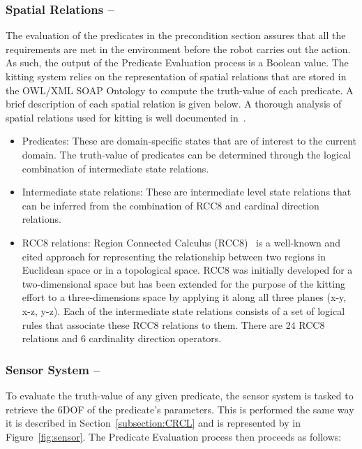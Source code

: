 \subsubsection{Spatial Relations -- }
 The evaluation of the predicates in the precondition section assures that all the requirements are met in the environment before the robot carries out the action. As such, the output of the \textsf{Predicate Evaluation} process is a Boolean value. The kitting system relies on the representation of spatial relations that are stored in the \textsf{OWL/XML SOAP Ontology} to compute the truth-value of each predicate. A brief description of each spatial relation is given below. A thorough analysis of spatial relations used for kitting is well documented in~\cite{SCHLENOFF.RAS.2013}.
\begin{itemize}
 \item Predicates: These are domain-specific states that are of interest to the current domain. The truth-value of predicates can be determined through the logical combination of intermediate state relations.
\item Intermediate state relations: These are intermediate level state relations that can be inferred from the combination of RCC8 and cardinal direction relations.
\item RCC8 relations: Region Connected Calculus (RCC8)~\cite{Wolter2000} is a well-known and cited approach for representing the relationship between two regions in Euclidean space or in a topological space. RCC8 was initially developed for a two-dimensional space but has been extended for the purpose of the kitting effort to a three-dimensions space by applying it along all three planes (x-y, x-z, y-z). Each of the intermediate state relations consists of a set of logical rules that associate these RCC8 relations to them. There are 24 RCC8 relations and 6 cardinality direction operators.
\end{itemize}

\subsubsection{Sensor System -- }
To evaluate the truth-value of any given predicate, the sensor system is tasked to retrieve the 6DOF of the predicate's parameters. This is performed the same way it is described in Section~\ref{subsection:CRCL} and is represented by  in Figure~\ref{fig:sensor}. The \textsf{Predicate Evaluation} process then proceeds as follows:

